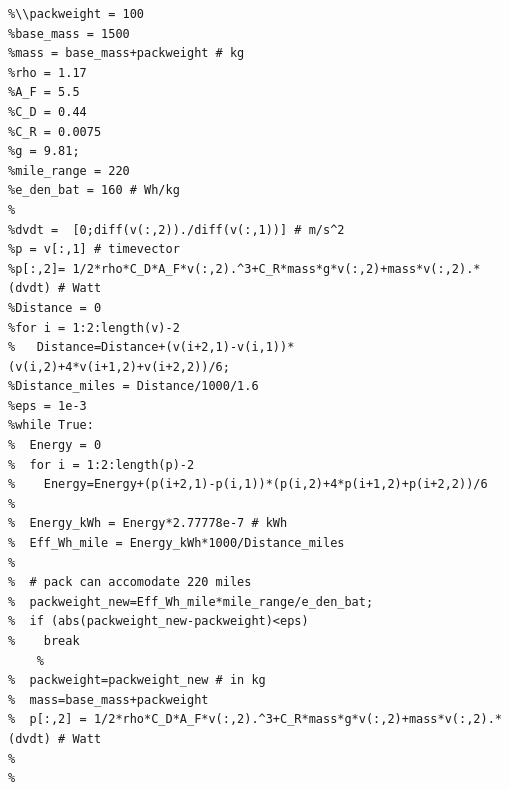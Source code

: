\documentclass[border=10pt]{standalone}
\begin{document}
\begin{lstlisting}
%\\packweight = 100
%base_mass = 1500
%mass = base_mass+packweight # kg
%rho = 1.17
%A_F = 5.5
%C_D = 0.44
%C_R = 0.0075
%g = 9.81;
%mile_range = 220
%e_den_bat = 160 # Wh/kg
%
%dvdt =  [0;diff(v(:,2))./diff(v(:,1))] # m/s^2
%p = v[:,1] # timevector
%p[:,2]= 1/2*rho*C_D*A_F*v(:,2).^3+C_R*mass*g*v(:,2)+mass*v(:,2).*(dvdt) # Watt
%Distance = 0
%for i = 1:2:length(v)-2
%	Distance=Distance+(v(i+2,1)-v(i,1))*(v(i,2)+4*v(i+1,2)+v(i+2,2))/6;
%Distance_miles = Distance/1000/1.6
%eps = 1e-3
%while True:
%  Energy = 0
%  for i = 1:2:length(p)-2
%    Energy=Energy+(p(i+2,1)-p(i,1))*(p(i,2)+4*p(i+1,2)+p(i+2,2))/6
%
%  Energy_kWh = Energy*2.77778e-7 # kWh
%  Eff_Wh_mile = Energy_kWh*1000/Distance_miles
%
%  # pack can accomodate 220 miles
%  packweight_new=Eff_Wh_mile*mile_range/e_den_bat;
%  if (abs(packweight_new-packweight)<eps)
%    break
	%
%  packweight=packweight_new # in kg
%  mass=base_mass+packweight
%  p[:,2] = 1/2*rho*C_D*A_F*v(:,2).^3+C_R*mass*g*v(:,2)+mass*v(:,2).*(dvdt) # Watt
%
%
\end{lstlisting}
\end{document}
